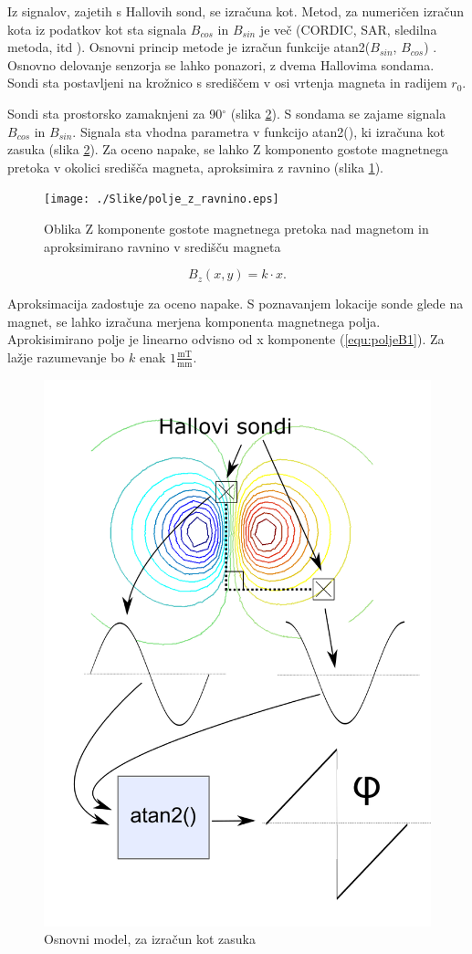 Iz signalov, zajetih s Hallovih sond, se izračuna kot. Metod, za numeričen izračun kota iz podatkov kot sta signala $B_{cos}$ in $B_{sin}$ je več (CORDIC, SAR, sledilna metoda, itd \cite{ICHaus_interpolate}). Osnovni
princip metode je izračun funkcije atan2($B_{sin}$, $B_{cos}$) \cite{atan2Matlab}.
\newpage
Osnovno delovanje senzorja se lahko ponazori, z dvema Hallovima sondama.  Sondi sta postavljeni na krožnico s središčem v osi vrtenja magneta in radijem $r_0$.

Sondi sta prostorsko zamaknjeni za 90$^\circ$ (slika \ref{opis_modela}).  S sondama se zajame signala $B_{cos}$ in $B_{sin}$. Signala sta vhodna parametra v funkcijo atan2(), ki izračuna kot zasuka (slika \ref{opis_modela}).
Za oceno napake, se lahko Z komponento gostote magnetnega pretoka v okolici središča magneta, aproksimira z ravnino (slika \ref{polje_z_ravnino}).
\begin{figure}[h]
	\centering
	\texttt{[image: ./Slike/polje\_z\_ravnino.eps]}
	\caption{Oblika Z komponente gostote magnetnega pretoka nad magnetom in aproksimirano ravnino v središču magneta}
	\label{polje_z_ravnino}
\end{figure}
\begin{equation}
\label{equ:poljeB1}
B_z(x,y)=k\cdot x.
\end{equation} 



Aproksimacija zadostuje za oceno napake. S poznavanjem lokacije sonde glede na magnet, se lahko izračuna merjena komponenta magnetnega polja. Aprokisimirano polje je linearno odvisno od x komponente (\ref{equ:poljeB1}).
Za lažje razumevanje bo $k$ enak $1\frac{\mathrm{mT}}{\mathrm{mm}}$.

\begin{figure}[h]
	\centering
	\includegraphics[width=0.9\columnwidth]{./Slike/opis_modela.png}
	\caption{Osnovni model, za izračun kot zasuka}
	\label{opis_modela}
\end{figure}